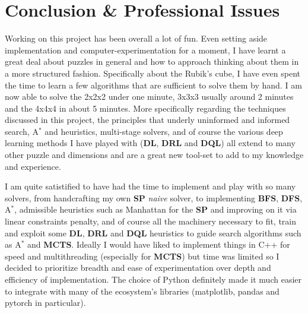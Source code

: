 
\chapter{Conclusion \& Professional Issues} %

\label{Conclusion} %



Working on this project has been overall a lot of fun. Even setting aside implementation and computer-experimentation for a moment, I have learnt a great deal about puzzles in general and how to approach thinking about them in a more structured fashion. Specifically about the Rubik's cube, I have even spent the time to learn a few algorithms that are sufficient to solve them by hand. I am now able to solve the 2x2x2 under one minute, 3x3x3 usually around 2 minutes and the 4x4x4 in about 5 minutes. More specifically regarding the techniques discussed in this project, the principles that underly uninformed and informed search, A$^{*}$ and heuristics, multi-stage solvers, and of course the various deep learning methods I have played with (\textbf{DL}, \textbf{DRL} and \textbf{DQL}) all extend to many other puzzle and dimensions and are a great new tool-set to add to my knowledge and experience.

I am quite satistified to have had the time to implement and play with so many solvers, from handcrafting my own \textbf{SP} \textit{naive} solver, to implementing \textbf{BFS}, \textbf{DFS}, A$^{*}$, admissible heuristics such as Manhattan for the \textbf{SP} and improving on it via linear constraints penalty, and of course all the machinery necessary to fit, train and exploit some \textbf{DL}, \textbf{DRL} and \textbf{DQL} heuristics to guide search algorithms such as  A$^{*}$ and \textbf{MCTS}. Ideally I would have liked to implement things in C++ for speed and multithreading (especially for \textbf{MCTS}) but time was limited so I decided to prioritize breadth and ease of experimentation over depth and efficiency of implementation. The choice of Python definitely made it much easier to integrate with many of the ecosystem's libraries (matplotlib, pandas and pytorch in particular).

